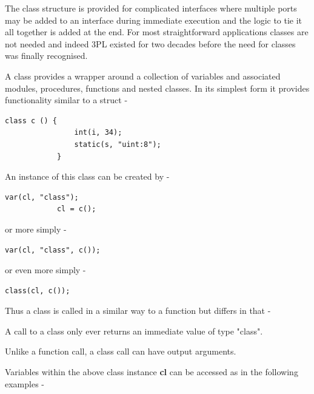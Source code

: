         The class structure is provided for complicated interfaces where multiple
        ports may be added to an interface during immediate execution and the
        logic to tie it all together is added at the end. For most straightforward
        applications classes are not needed and indeed 3PL existed for two decades
        before the need for classes was finally recognised.
       
        A class provides a wrapper around a collection of variables and associated
        modules, procedures, functions and nested classes. In its simplest form
        it provides functionality similar to a struct -
        
        \begin{lstlisting}[gobble=8, language=threepl]
            class c () {
                int(i, 34);
                static(s, "uint:8");
            }
        \end{lstlisting}
        
        An instance of this class can be created by -
        
        \begin{lstlisting}[gobble=8, language=threepl]
            var(cl, "class");
            cl = c();
        \end{lstlisting}
        
        or more simply -
        
        \begin{lstlisting}[gobble=8, language=threepl]
            var(cl, "class", c());
        \end{lstlisting}
                
        or even more simply -
        
        \begin{lstlisting}[gobble=8, language=threepl]
            class(cl, c());
        \end{lstlisting}
        
        Thus a class is called in a similar way to a function but differs in that -
        \blist
        \item   A call to a class only ever returns an immediate value of type
                "class".
        \item   Unlike a function call, a class call can have output arguments.
        \blend        
        
        Variables within the above class instance {\bf cl} can be accessed as
        in the following examples -
        
